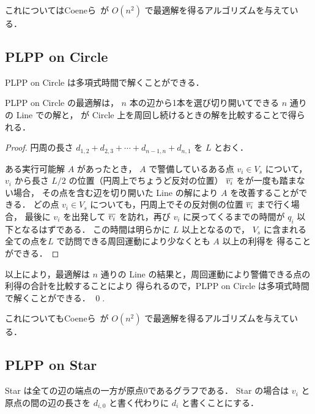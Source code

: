 これについてはCoeneら~\cite{coene2011charlemagne}が
$O(n^2)$ で最適解を得るアルゴリズムを与えている．



\subsection{PLPP on Circle}
\begin{theo}
	PLPP on Circle は多項式時間で解くことができる．
	\label{theo:PLPPonCircle_1}
\end{theo}


\begin{lemm}
	PLPP on Circle の最適解は，
	$n$ 本の辺から1本を選び切り開いてできる $n$ 通りの Line での解と，
	\server が Circle 上を周回し続けるときの解を比較することで得られる．
\end{lemm}

\begin{proof}
	円周の長さ $d_{1,2} + d_{2,3} + \cdots + d_{n-1,n} + d_{n,1}$ を $L$ とおく．

	ある実行可能解 $A$ があったとき，
	$A$ で警備しているある点 $v_i \in V_s$ について，
	$v_i$ から長さ $L/2$ の位置（円周上でちょうど反対の位置） $\overline{v_i}$ 
	を\server が一度も踏まない場合，
	その点を含む辺を切り開いた Line の解により $A$ を改善することができる．
	どの点 $v_i \in V_s$ についても，円周上でその反対側の位置 $\overline{v_i}$ まで行く場合，
	最後に $v_i$ を出発して $\overline{v_i}$ を訪れ，再び $v_i$ に戻ってくるまでの時間が 
	$q_i$ 以下となるはずである．
	この時間は明らかに $L$ 以上となるので，
	$V_s$ に含まれる全ての点を\shuki $L$ で訪問できる周回運動により少なくとも $A$ 以上の利得を
	得ることができる．
\end{proof}

以上により，最適解は 
$n$ 通りの Line の結果と，周回運動により警備できる点の利得の合計を比較することにより
得られるので，PLPP on Circle は多項式時間で解くことができる．
\qed {}.

これについてもCoeneら~\cite{coene2011charlemagne}が
$O(n^2)$ で最適解を得るアルゴリズムを与えている．




\subsection{PLPP on Star}
Star は全ての辺の端点の一方が原点$0$であるグラフである．
Star の場合は $v_i$ と原点の間の辺の長さを $d_{i,0}$ と書く代わりに $d_i$ と書くことにする．

